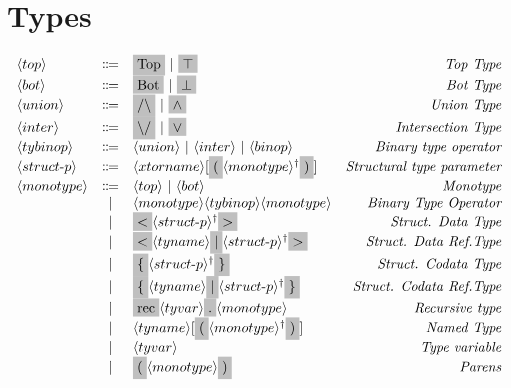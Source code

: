 \section{Types}
\[
  \begin{array}{lclr}
    \nonterminal{top} & \Coloneqq & \terminal{Top}\ |\ \terminal{$\top$} & \emph{Top Type} \\
    \nonterminal{bot} & \Coloneqq & \terminal{Bot}\ |\ \terminal{$\bot$} & \emph{Bot Type} \\
    \nonterminal{union} & \Coloneqq & \terminal{$/\backslash$}\ |\ \terminal{$\wedge$} & \emph{Union Type} \\
    \nonterminal{inter} & \Coloneqq & \terminal{$\backslash /$}\ |\ \terminal{$\vee$} & \emph{Intersection Type} \\
    \nonterminal{tybinop} & \Coloneqq & \nonterminal{union}\ |\ \nonterminal{inter}\ |\ \nonterminal{binop} & \emph{Binary type operator} \\
    \nonterminal{struct$-$p} & \Coloneqq & \nonterminal{xtorname}[\terminal{(}\commalist{\nonterminal{monotype}} \terminal{)}] & \emph{Structural type parameter} \\
    \nonterminal{monotype} & \Coloneqq & \nonterminal{top}\ |\ \nonterminal{bot} & \emph{Monotype} \\
    & | & \nonterminal{monotype} \nonterminal{tybinop} \nonterminal{monotype} & \emph{Binary Type Operator} \\
    & | & \terminal{$<$} \commalist{\nonterminal{struct$-$p}} \terminal{$>$} & \emph{Struct. Data Type} \\
    & | & \terminal{$<$} \nonterminal{tyname} \terminal{$|$} \commalist{\nonterminal{struct$-$p}} \terminal{$>$} & \emph{Struct. Data Ref.Type} \\
    & | & \terminal{$\{$} \commalist{\nonterminal{struct$-$p}} \terminal{$\}$} & \emph{Struct. Codata Type} \\
    & | & \terminal{$\{$} \nonterminal{tyname} \terminal{$|$} \commalist{\nonterminal{struct$-$p}} \terminal{$\}$} & \emph{Struct. Codata Ref.Type} \\
    & | & \terminal{rec} \nonterminal{tyvar} \terminal{.} \nonterminal{monotype} & \emph{Recursive type} \\
    & | & \nonterminal{tyname}[\terminal{(} \commalist{\nonterminal{monotype}}\terminal{)}] & \emph{Named Type} \\
    & | & \nonterminal{tyvar} & \emph{Type variable} \\
    & | & \terminal{(} \nonterminal{monotype} \terminal{)} & \emph{Parens} \\

\end{array}\]
